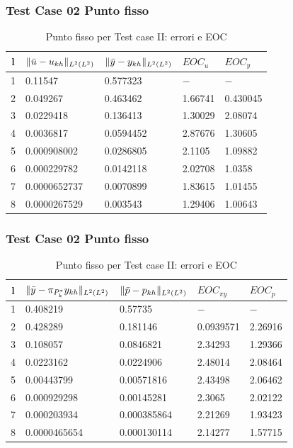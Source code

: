 \documentclass{beamer}
\theoremstyle{definition}
\theoremstyle{remark}
\theoremstyle{plain}
\theoremstyle{definition}
\DeclarePairedDelimiter{\norma}{\lVert}{\rVert}
\begin{document}
\begin{frame}
\frametitle{Test Case 02 Punto fisso}

\begin{table}
\caption{Punto fisso per Test case II: errori e EOC }
\label{puntofissoII}
\centering

\begin{tabular}{cllll}
\toprule
{l}           &  {$ \norma{\bar{u}-u_{kh}}_{L^2(L^2)} $} &  {$ \norma{\bar{y}-y_{kh}}_{L^2(L^2)} $} &  {$ EOC_{u} $} &  {$ EOC_y $} \\
\midrule
1            &  0.11547 &  0.577323 &  {$-$} &  {$-$} \\
2            &  0.049267 &  0.463462 &  1.66741 &  0.430045 \\
3            &  0.0229418 &  0.136413 &  1.30029 &  2.08074 \\
4            &  0.0036817 &  0.0594452 &  2.87676 &  1.30605 \\
5            &  0.000908002 &  0.0286805 &  2.1105 &  1.09882 \\
6            &  0.000229782  &  0.0142118 &  2.02708 &  1.0358 \\
7            &  0.0000652737 &  0.0070899 &  1.83615 &  1.01455 \\      
8            &  0.0000267529 &  0.003543 &  1.29406 &  1.00643 \\
\bottomrule
\end{tabular}              

\end{table}


\end{frame}

\begin{frame}
\frametitle{Test Case 02 Punto fisso}
\begin{table}
\caption{Punto fisso per Test case II: errori e EOC }
\label{puntofissoIIbis}
\centering

\begin{tabular}{cllll}
\toprule
{l}           &  {$ \norma{\bar{y}-\pi_{P^*_k}y_{kh}}_{L^2(L^2)} $} &  {$ \norma{\bar{p}-p_{kh}}_{L^2(L^2)} $} &  {$ EOC_{\pi y} $} &  {$ EOC_p $} \\
\midrule
1            &  0.408219 &  0.57735 &  {$-$} &  {$-$} \\
2            &  0.428289 &  0.181146 &  0.0939571 &  2.26916 \\
3            &  0.108057  &  0.0846821 &  2.34293 &  1.29366 \\
4            &  0.0223162  &  0.0224906 &  2.48014 &  2.08464 \\
5            &  0.00443799 &  0.00571816 &  2.43498 &  2.06462 \\
6            &  0.000929298 &  0.00145281 &  2.3065 &  2.02122 \\
7            &  0.000203934 &  0.000385864 &  2.21269 &  1.93423 \\      
8            &  0.0000465654 &  0.000130114 &  2.14277 &  1.57715 \\
\bottomrule
\end{tabular}              
\end{table}

\end{frame}
\end{document}
